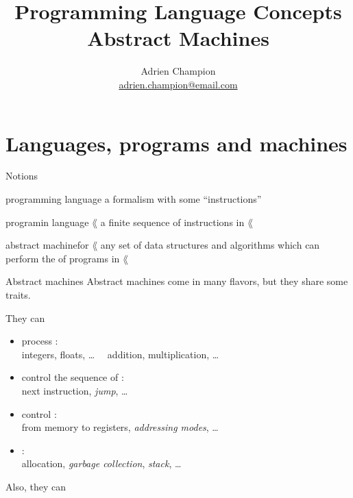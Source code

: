 \documentclass[10pt]{beamer}
\title{
  Programming Language Concepts\\[3em]
  Abstract Machines\\[2em]
}
\author[]{
  Adrien Champion\\
  \href{mailto:adrien.champion@email.com}{adrien.champion@email.com}
}
\date{}
\begin{document}
\addtolength{\leftmargin}{-20pt}
\addtolength{\rightmargin}{-20pt}



\begin{frame}{}
  \titlepage
\end{frame}



\section{Languages, programs and machines}


\begin{frame}[fragile]{Notions}
  \begin{define}{programming language}{}
    a formalism with some ``instructions''
  \end{define}

  \begin{define}{program}{in language $\lang$}%
    a finite sequence of instructions in $\lang$
  \end{define}
  \pause

  \begin{define}{abstract machine}{for $\lang$}
    any set of data structures and algorithms which can perform the
     of programs in $\lang$
  \end{define}
\end{frame}



\begin{frame}{Abstract machines}
  Abstract machines come in many flavors, but they share some traits.
  \bigskip

  They can
  \medskip
  \begin{itemize}
  \item process :\\
    \hfill integers, floats, \ldots $\quad$
    addition, multiplication, \ldots\\
  \item control the sequence of :\\
    \hfill next instruction, \emph{jump}, \ldots
  \item control :\\
    \hfill from memory to registers, \emph{addressing modes}, \ldots
  \item {}:\\
    \hfill allocation, \emph{garbage collection}, \emph{stack}, \ldots
  \end{itemize}
  \bigskip

  \pause

  Also, they can 
\end{frame}
\end{document}
